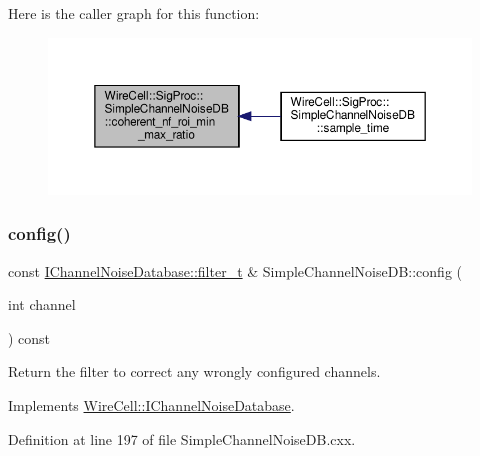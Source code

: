 Here is the caller graph for this function\+:
\nopagebreak
\begin{figure}[H]
\begin{center}
\leavevmode
\includegraphics[width=350pt]{class_wire_cell_1_1_sig_proc_1_1_simple_channel_noise_d_b_a31eba95e77c824eb351f3ed4e5e58eac_icgraph}
\end{center}
\end{figure}
\mbox{\label{class_wire_cell_1_1_sig_proc_1_1_simple_channel_noise_d_b_a3eabaf3d48c127aaa6c594c682e6a77a}} 
\subsubsection{\texorpdfstring{config()}{config()}}
{\footnotesize\ttfamily const \hyperlink{class_wire_cell_1_1_i_channel_noise_database_a0acbae29743542eb1c652f7a56e692f5}{I\+Channel\+Noise\+Database\+::filter\+\_\+t} \& Simple\+Channel\+Noise\+D\+B\+::config (\begin{DoxyParamCaption}\item[{int}]{channel }\end{DoxyParamCaption}) const\hspace{0.3cm}{\ttfamily [virtual]}}



Return the filter to correct any wrongly configured channels. 



Implements \hyperlink{class_wire_cell_1_1_i_channel_noise_database_af6887aa00ed134c7fcb1ee85bd950311}{Wire\+Cell\+::\+I\+Channel\+Noise\+Database}.



Definition at line 197 of file Simple\+Channel\+Noise\+D\+B.\+cxx.

